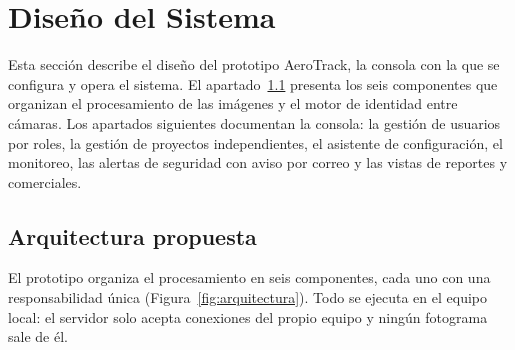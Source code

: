 \section{Diseño del Sistema}
\label{sec:diseno-sistema}

Esta sección describe el diseño del prototipo AeroTrack, la consola con la que se configura y
opera el sistema. El apartado~\ref{subsec:arquitectura} presenta los seis componentes que
organizan el procesamiento de las imágenes y el motor de identidad entre cámaras. Los
apartados siguientes documentan la consola: la gestión de usuarios por roles, la gestión de
proyectos independientes, el asistente de configuración, el monitoreo, las alertas de seguridad con aviso por correo
y las vistas de reportes y comerciales.

\subsection{Arquitectura propuesta}
\label{subsec:arquitectura}

El prototipo organiza el procesamiento en seis componentes, cada uno con una
responsabilidad única (Figura~\ref{fig:arquitectura}). Todo se ejecuta en el equipo local: el
servidor solo acepta conexiones del propio equipo y ningún fotograma sale de él.

